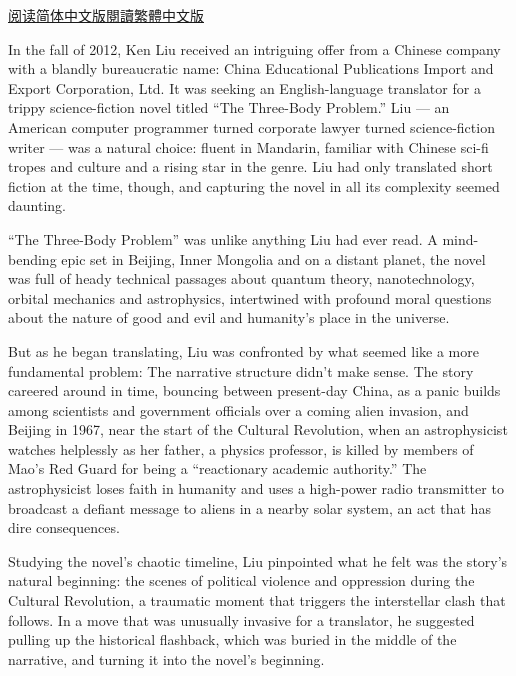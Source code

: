 \href{https://cn.nytimes3xbfgragh.onion/culture/20191206/ken-liu-three-body-problem-chinese-science-fiction/}{阅读简体中文版}\href{https://cn.nytimes3xbfgragh.onion/culture/20191206/ken-liu-three-body-problem-chinese-science-fiction/zh-hant/}{閱讀繁體中文版}

In the fall of 2012, Ken Liu received an intriguing offer from a Chinese
company with a blandly bureaucratic name: China Educational Publications
Import and Export Corporation, Ltd. It was seeking an English-language
translator for a trippy science-fiction novel titled ``The Three-Body
Problem.'' Liu --- an American computer programmer turned corporate
lawyer turned science-fiction writer --- was a natural choice: fluent in
Mandarin, familiar with Chinese sci-fi tropes and culture and a rising
star in the genre. Liu had only translated short fiction at the time,
though, and capturing the novel in all its complexity seemed daunting.

``The Three-Body Problem'' was unlike anything Liu had ever read. A
mind-bending epic set in Beijing, Inner Mongolia and on a distant
planet, the novel was full of heady technical passages about quantum
theory, nanotechnology, orbital mechanics and astrophysics, intertwined
with profound moral questions about the nature of good and evil and
humanity's place in the universe.

But as he began translating, Liu was confronted by what seemed like a
more fundamental problem: The narrative structure didn't make sense. The
story careered around in time, bouncing between present-day China, as a
panic builds among scientists and government officials over a coming
alien invasion, and Beijing in 1967, near the start of the Cultural
Revolution, when an astrophysicist watches helplessly as her father, a
physics professor, is killed by members of Mao's Red Guard for being a
``reactionary academic authority.'' The astrophysicist loses faith in
humanity and uses a high-power radio transmitter to broadcast a defiant
message to aliens in a nearby solar system, an act that has dire
consequences.

Studying the novel's chaotic timeline, Liu pinpointed what he felt was
the story's natural beginning: the scenes of political violence and
oppression during the Cultural Revolution, a traumatic moment that
triggers the interstellar clash that follows. In a move that was
unusually invasive for a translator, he suggested pulling up the
historical flashback, which was buried in the middle of the narrative,
and turning it into the novel's beginning.

